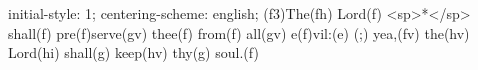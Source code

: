 initial-style: 1;
centering-scheme: english;
(f3)The(fh) Lord(f) <sp>*</sp> shall(f) pre(f)serve(gv) thee(f) from(f) all(gv) e(f)vil:(e) (;) yea,(fv) the(hv) Lord(hi) shall(g) keep(hv) thy(g) soul.(f)
